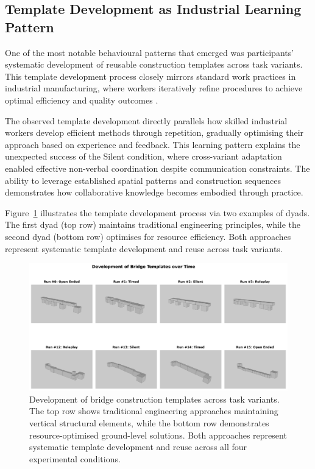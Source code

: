 \subsection{Template Development as Industrial Learning Pattern}
One of the most notable behavioural patterns that emerged was participants' systematic development of reusable construction templates across task variants. This template development process closely mirrors standard work practices in industrial manufacturing, where workers iteratively refine procedures to achieve optimal efficiency and quality outcomes \cite{kamrani2006methodology}.

The observed template development directly parallels how skilled industrial workers develop efficient methods through repetition, gradually optimising their approach based on experience and feedback. This learning pattern explains the unexpected success of the Silent condition, where cross-variant adaptation enabled effective non-verbal coordination despite communication constraints. The ability to leverage established spatial patterns and construction sequences demonstrates how collaborative knowledge becomes embodied through practice.

Figure~\ref{fig:bridge_contrast_traditional_vs_optimized} illustrates the template development process via two examples of dyads. The first dyad (top row) maintains traditional engineering principles, while the second dyad (bottom row) optimises for resource efficiency. Both approaches represent systematic template development and reuse across task variants.

\begin{figure}[H]
\centering
\includegraphics[width=\textwidth]{assets/06/bridge_contrast_traditional_vs_optimized.pdf}
\caption{Development of bridge construction templates across task variants. The top row shows traditional engineering approaches maintaining vertical structural elements, while the bottom row demonstrates resource-optimised ground-level solutions. Both approaches represent systematic template development and reuse across all four experimental conditions.}
\label{fig:bridge_contrast_traditional_vs_optimized}
\end{figure}

